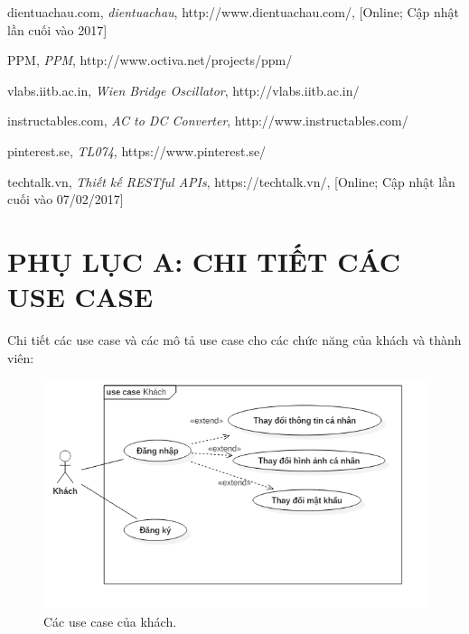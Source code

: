 \documentclass[a4paper,12pt,oneside]{article}
\begin{document}
\begin{thebibliography}{80}
 dientuachau.com,
\textit{dientuachau}, http://www.dientuachau.com/, [Online; Cập nhật lần cuối vào 2017]
		
 PPM,
\textit{PPM}, http://www.octiva.net/projects/ppm/

 vlabs.iitb.ac.in,
\textit{Wien Bridge Oscillator}, http://vlabs.iitb.ac.in/

 instructables.com,
\textit{AC to DC Converter}, http://www.instructables.com/

 pinterest.se,
\textit{TL074}, https://www.pinterest.se/

 techtalk.vn,
\textit{Thiết kế RESTful APIs}, https://techtalk.vn/, [Online; Cập nhật lần cuối vào 07/02/2017]

\end{thebibliography}


\newpage
\appendix
\section{PHỤ LỤC A: CHI TIẾT CÁC USE CASE}

\noindent Chi tiết các use case và các mô tả use case cho các chức năng của khách và thành viên:
\begin{figure}[H]
\centering
\includegraphics[scale=.7]{hinh/usecase-guess.png}
\caption{Các use case của khách.}
\end{figure}
\end{document}

